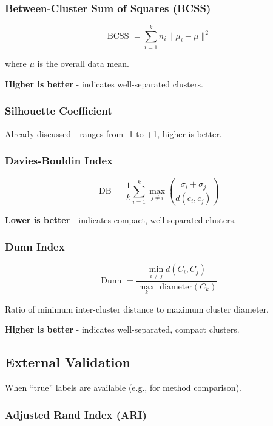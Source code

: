 \documentclass[
]{article}
\begin{document}
\subsubsection{Between-Cluster Sum of Squares (BCSS)}

\[\text{ BCSS } = \sum_{i = 1}^{k}n_{i}\|\mu_{i} - \mu\|^{2}\]

where \(\mu\) is the overall data mean.

\textbf{Higher is better} - indicates well-separated clusters.

\subsubsection{Silhouette Coefficient}

Already discussed - ranges from -1 to +1, higher is better.

\subsubsection{Davies-Bouldin Index}

\[\text{ DB } = \frac{1}{k}\sum_{i = 1}^{k}\max\limits_{j \neq i}\left( \frac{\sigma_{i} + \sigma_{j}}{d\left( c_{i},c_{j} \right)} \right)\]

\textbf{Lower is better} - indicates compact, well-separated clusters.

\subsubsection{Dunn Index}

\[\text{ Dunn } = \frac{\min\limits_{i \neq j}d\left( C_{i},C_{j} \right)}{\max\limits_{k}\text{ diameter}\left( C_{k} \right)}\]

Ratio of minimum inter-cluster distance to maximum cluster diameter.

\textbf{Higher is better} - indicates well-separated, compact clusters.

\textbf{ }

\subsection{External Validation}

When ``true'' labels are available (e.g., for method comparison).

\subsubsection{Adjusted Rand Index (ARI)}
\end{document}
